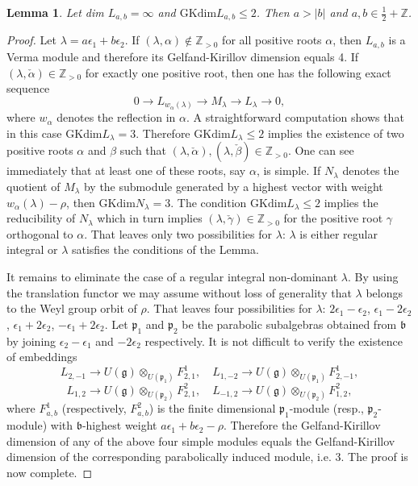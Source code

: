 \documentclass[12pt]{amsart}
\theoremstyle{plain} %
\newtheorem{lemma}[definition]{Lemma}
\newcommand {\ZZ} {\mathbb {Z}}
\renewcommand{\gg}{\mathfrak{g}}
\newcommand{\bb}{\mathfrak{b}}
\newcommand{\pp}{\mathfrak{p}}
\newcommand{\eps}{\epsilon}
\newcommand{\half}{\frac{1}{2}}
\newcommand {\gkdim} {\mathrm{GKdim }}
\begin{document}
\begin{lemma}\label {le100}
Let dim $L_{a,b}=\infty$ and $\gkdim L_{a,b}\leq 2$. Then $a>| b|$ and $a,b\in \half+\ZZ$.
\end{lemma}
\begin {proof} Let $\lambda=a\eps_1+b\eps_2$. If $(\lambda,\alpha)\notin
  \ZZ_{>0}$ for all positive roots $\alpha$, then $L_{a,b}$ is
  a Verma module and therefore its Gelfand-Kirillov
  dimension equals 4. If $(\lambda,\check\alpha)\in \ZZ_{>0}$ for exactly one positive
  root, then one has the following exact sequence
\[
0\to L_{w_\alpha(\lambda)} \to M_{\lambda} \to L_{\lambda}\to 0,
\]
where $w_{\alpha}$ denotes the reflection in $\alpha$. A straightforward computation shows that in this case $\gkdim
L_{\lambda}=3$. Therefore $\gkdim L_{\lambda}\leq 2$ implies the existence
of two positive roots $\alpha$ and $\beta$ such that
$(\lambda,\check\alpha), (\lambda,\check\beta) \in \ZZ_{>0}$. One can see
immediately that at least one of these roots, say $\alpha$, is
simple. If $N_{\lambda}$ denotes the quotient of $M_{\lambda}$ by the 
submodule generated 
by a highest vector with weight $w_\alpha(\lambda)-\rho$, then $\gkdim
N_{\lambda}=3$. The condition $\gkdim L_{\lambda}\leq 2$ implies the 
reducibility of
$N_{\lambda}$ which in turn implies $(\lambda,\check\gamma) \in \ZZ_{>0}$
for the positive root $\gamma$ orthogonal to $\alpha$. That leaves only
two possibilities for $\lambda$: $\lambda$ is either regular integral
or $\lambda$ satisfies the conditions of the Lemma.

It remains to eliminate the case of a regular integral non-dominant $\lambda$. By using the translation functor we may assume without loss of generality that $\lambda$ belongs to the Weyl group orbit of $\rho$. That leaves four possibilities for $\lambda$: $2\eps_1-\eps_2$, $\eps_1-2\eps_2$, $\eps_1+2\eps_2$, $-\eps_1+2\eps_2$.  Let $\pp_1$ and $\pp_2$ be the parabolic subalgebras obtained from $\bb$ by joining $\eps_2-\eps_1$ and $-2\eps_2$ respectively. It is  not difficult to verify the existence of embeddings
\[
L_{2,-1}\to U(\gg)\otimes_{U(\pp_1)}F^1_{2,1},\quad
L_{1,-2}\to U(\gg)\otimes_{U(\pp_1)}F^1_{2,-1},
\]
\[
L_{1,2}\to U(\gg)\otimes_{U(\pp_2)}F^2_{2,1},\quad
L_{-1,2}\to U(\gg)\otimes_{U(\pp_2)}F^2_{1,2},
\]
where $F_{a,b}^1$ (respectively, $F_{a,b}^2$) is the finite
 dimensional $\pp_1$-module (resp., $\pp_2$-module) with $\bb$-highest
 weight $a\eps_1+b\eps_2-\rho$. Therefore 
 the Gelfand-Kirillov dimension of any of the above four simple
 modules equals the Gelfand-Kirillov dimension of the corresponding
 parabolically induced module, i.e. 3. The proof is now complete.
\end{proof}
\end{document}
